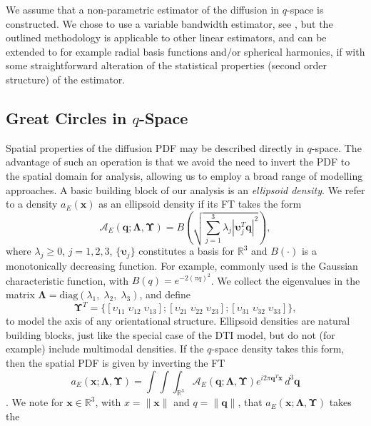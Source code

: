 \documentclass[dvips,aoas,preprint]{imsart}
\numberwithin{equation}{section}
\theoremstyle{plain}
\newcommand{\q}{\mathbf{q}}
\newcommand{\bu}{\bs{\upsilon}}
\newcommand{\x}{\mathbf{x}}
\newcommand{\cA}{\mathcal{A}}
\newcommand{\bs}[1]{\boldsymbol{#1}}
\begin{document}
We assume that a non-parametric estimator of the diffusion in
$q$-space is constructed. We chose to use a variable bandwidth estimator, see
\citet{OlhedeWhitcher,OlhedeWhitcherISBI}, but the outlined methodology
is applicable to other linear estimators, and can be extended to for
example radial basis functions and/or spherical harmonics, if with
some straightforward alteration of the statistical properties (second order structure) of the
estimator.

\subsection{Great Circles in $q$-Space}

Spatial properties of the diffusion PDF may be described directly in
$q$-space.  The advantage of such an operation is that we avoid the
need to invert the PDF to the spatial domain for analysis, allowing us
to employ a broad range of modelling approaches.  A basic building
block of our analysis is an {\em ellipsoid density}.  We refer to a
density $a_E(\x)$ as an ellipsoid density if its FT takes the form
\begin{equation}\label{ellipsoid}
  \cA_E\left(\q; \bm{\Lambda},\bm{\Upsilon}\right) =
  B\left(\sqrt{\sum_{j=1}^3\lambda_j\left|\bu_j^T\q\right|^2
  }\right),
\end{equation}
where $\lambda_j\ge{0}$, $j=1,2,3$, $\{\bu_j\}$ constitutes a basis
for ${\mathbb{R}}^3$ and $B(\cdot)$ is a monotonically decreasing
function.  For example, commonly used is the Gaussian characteristic function, with
$B(q)=e^{-2(\pi q)^2}$.  We collect the eigenvalues in the matrix
$\bs{\Lambda}={\text{diag}}\left(\lambda_1,\;\lambda_2,\;\lambda_3\right)$,
and define
\[\bm{\Upsilon}^T=\{[\upsilon_{11}\;\upsilon_{12}\;\upsilon_{13}];
[\upsilon_{21}\;\upsilon_{22}\;\upsilon_{23}];
[\upsilon_{31}\;\upsilon_{32}\;\upsilon_{33}]\},\] to model the axis of any orientational structure.  Ellipsoid densities
are natural building blocks, just like the special case of the DTI
model, but do not (for example) include multimodal densities.  If the $q$-space
density takes this form, then the spatial PDF is given by inverting
the FT
\begin{equation}
  a_E(\x;\bm{\Lambda},\bm{\Upsilon}) = \int\int\int_{\mathbb{R}^3}
  \cA_E(\q; \bm{\Lambda},\bm{\Upsilon})e^{i2\pi \q^T\x} \, d^3 \q
\end{equation}
\citep{Callaghan}.  We note for $\x\in\mathbb{R}^3$, with $x=\|\x\|$
and $q=\|\q\|$, that $a_E(\x;\bm{\Lambda},\bm{\Upsilon})$ takes the
\end{document}
